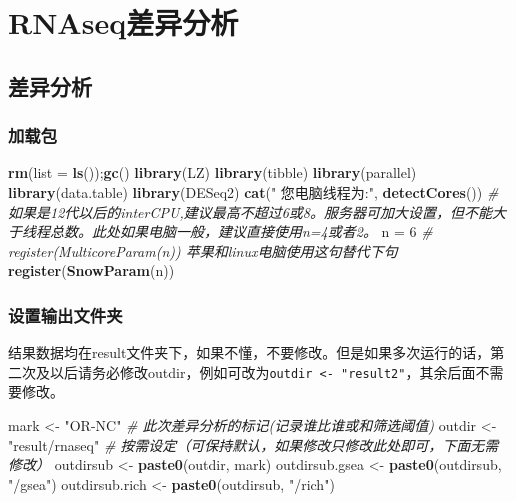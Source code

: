 \documentclass[
]{book}
\newenvironment{Shaded}{\begin{snugshade}}{\end{snugshade}}
\newcommand{\AttributeTok}[1]{\textcolor[rgb]{0.13,0.29,0.53}{#1}}
\newcommand{\CommentTok}[1]{\textcolor[rgb]{0.56,0.35,0.01}{\textit{#1}}}
\newcommand{\DecValTok}[1]{\textcolor[rgb]{0.00,0.00,0.81}{#1}}
\newcommand{\FunctionTok}[1]{\textcolor[rgb]{0.13,0.29,0.53}{\textbf{#1}}}
\newcommand{\NormalTok}[1]{#1}
\newcommand{\OtherTok}[1]{\textcolor[rgb]{0.56,0.35,0.01}{#1}}
\newcommand{\StringTok}[1]{\textcolor[rgb]{0.31,0.60,0.02}{#1}}
\begin{document}
\hypertarget{deg}{%
\chapter{RNAseq差异分析}\label{deg}}

\hypertarget{deg-mian}{%
\section{差异分析}\label{deg-mian}}

\hypertarget{ux52a0ux8f7dux5305}{%
\subsection{加载包}\label{ux52a0ux8f7dux5305}}

\begin{Shaded}
\begin{Highlighting}[]
\FunctionTok{rm}\NormalTok{(}\AttributeTok{list =} \FunctionTok{ls}\NormalTok{());}\FunctionTok{gc}\NormalTok{()}
\FunctionTok{library}\NormalTok{(LZ)}
\FunctionTok{library}\NormalTok{(tibble)}
\FunctionTok{library}\NormalTok{(parallel)}
\FunctionTok{library}\NormalTok{(data.table)}
\FunctionTok{library}\NormalTok{(DESeq2)}
\FunctionTok{cat}\NormalTok{(}\StringTok{" 您电脑线程为:"}\NormalTok{, }\FunctionTok{detectCores}\NormalTok{())}
\CommentTok{\# 如果是12代以后的interCPU,建议最高不超过6或8。服务器可加大设置，但不能大于线程总数。此处如果电脑一般，建议直接使用n=4或者2。}
\NormalTok{n }\OtherTok{=} \DecValTok{6}  
\CommentTok{\# register(MulticoreParam(n)) 苹果和linux电脑使用这句替代下句}
\FunctionTok{register}\NormalTok{(}\FunctionTok{SnowParam}\NormalTok{(n))}
\end{Highlighting}
\end{Shaded}

\hypertarget{ux8bbeux7f6eux8f93ux51faux6587ux4ef6ux5939}{%
\subsection{设置输出文件夹}\label{ux8bbeux7f6eux8f93ux51faux6587ux4ef6ux5939}}

结果数据均在result文件夹下，如果不懂，不要修改。但是如果多次运行的话，第二次及以后请务必修改outdir，例如可改为\texttt{outdir\ \textless{}-\ "result2"}，其余后面不需要修改。

\begin{Shaded}
\begin{Highlighting}[]
\NormalTok{mark }\OtherTok{\textless{}{-}} \StringTok{"OR{-}NC"}  \CommentTok{\# 此次差异分析的标记(记录谁比谁或和筛选阈值)}
\NormalTok{outdir }\OtherTok{\textless{}{-}} \StringTok{"result/rnaseq"}  \CommentTok{\# 按需设定（可保持默认，如果修改只修改此处即可，下面无需修改）}
\NormalTok{outdirsub }\OtherTok{\textless{}{-}} \FunctionTok{paste0}\NormalTok{(outdir, mark)}
\NormalTok{outdirsub.gsea }\OtherTok{\textless{}{-}} \FunctionTok{paste0}\NormalTok{(outdirsub, }\StringTok{"/gsea"}\NormalTok{)}
\NormalTok{outdirsub.rich }\OtherTok{\textless{}{-}} \FunctionTok{paste0}\NormalTok{(outdirsub, }\StringTok{"/rich"}\NormalTok{)}
\end{Highlighting}
\end{Shaded}
\end{document}
